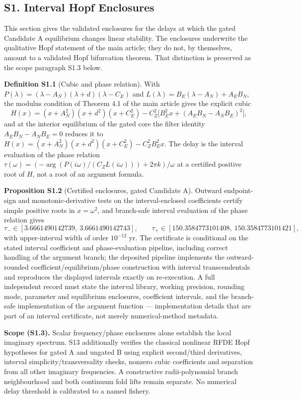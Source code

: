 \documentclass[
  10pt,
  a4paper,
]{article}
\begin{document}
\subsection{S1. Interval Hopf
Enclosures}\label{s1.-interval-hopf-enclosures}

This section gives the validated enclosures for the delays at which the
gated Candidate A equilibrium changes linear stability. The enclosures
underwrite the qualitative Hopf statement of the main article; they do
not, by themselves, amount to a validated Hopf bifurcation theorem. That
distinction is preserved as the scope paragraph S1.3 below.

\textbf{Definition S1.1} (Cubic and phase relation). With
\(P(\lambda) = (\lambda - A_N)(\lambda + d)(\lambda - C_E)\) and
\(L(\lambda) = B_E(\lambda - A_N) + A_E B_N\), the modulus condition of
Theorem 4.1 of the main article gives the explicit cubic
\[H(x) = (x + A_N^2)(x + d^2)(x + C_E^2) - C_Z^2\bigl[B_E^2 x + (A_E B_N - A_N B_E)^2\bigr],\]
and at the interior equilibrium of the gated core the filter identity
\(A_E B_N - A_N B_E = 0\) reduces it to
\(H(x) = (x + A_N^2)(x + d^2)(x + C_E^2) - C_Z^2 B_E^2 x\). The delay is
the interval evaluation of the phase relation
\(\tau(\omega) = (-\arg(P(i\omega)/(C_Z L(i\omega))) + 2\pi k)/\omega\)
at a certified positive root of \(H\), not a root of an argument
formula.

\textbf{Proposition S1.2} (Certified enclosures, gated Candidate A).
Outward endpoint-sign and monotonic-derivative tests on the
interval-enclosed coefficients certify simple positive roots in
\(x = \omega^2\), and branch-safe interval evaluation of the phase
relation gives
\[\tau_- \in [3.6661490142739,\ 3.6661490142743], \qquad \tau_+ \in [150.3584773101408,\ 150.3584773101421],\]
with upper-interval width of order \(10^{-12}\) yr. The certificate is
conditional on the stated interval coefficient and phase-evaluation
pipeline, including correct handling of the argument branch; the
deposited pipeline implements the outward-rounded
coefficient/equilibrium/phase construction with interval transcendentals
and reproduces the displayed intervals exactly on re-execution. A full
independent record must state the interval library, working precision,
rounding mode, parameter and equilibrium enclosures, coefficient
intervals, and the branch-safe implementation of the argument function
--- implementation details that are part of an interval certificate, not
merely numerical-method metadata.

\textbf{Scope (S1.3).} Scalar frequency/phase enclosures alone establish
the local imaginary spectrum. S13 additionally verifies the classical
nonlinear RFDE Hopf hypotheses for gated A and ungated B using explicit
second/third derivatives, interval simplicity/transversality checks,
nonzero cubic coefficients and separation from all other imaginary
frequencies. A constructive radii-polynomial branch neighbourhood and
both continuum fold lifts remain separate. No numerical delay threshold
is calibrated to a named fishery.
\end{document}
